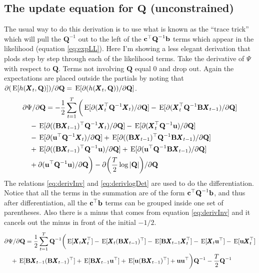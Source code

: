 \documentclass[]{article}
\def\UPS{\mbox{\boldmath $\Upsilon$}}
\def\BB{\mbox{$\mathbf B$}}	\def\bb{\mbox{$\mathbf b$}} \def\Bb{\mbox{$\mathbf J$}} \def\Ba{\mbox{$\mathbf L$}} \def\Bm{\UPS}
\def\E{\,\textup{\textrm{E}}}
\def\QQ{\mbox{$\mathbf Q$}}	 \def\qq{\mbox{$\mathbf q$}} \def\Qb{\mbox{$\mathbf G$}}  \def\Qm{\mathbb{Q}}
\def\XX{\mbox{$\pmb{X}$}}	\def\xx{\mbox{$\pmb{x}$}}
\begin{document}
\subsection{The update equation for $\QQ$ (unconstrained)}
\label{subsec:Qunconstrained}
The usual way to do this derivation is to use what is known as the ``trace trick'' which will pull the $\QQ^{-1}$ out to the left of the $\cc^\top\QQ^{-1}\bb$ terms which appear in the likelihood (equation \ref{eq:expLL}).  Here I'm showing a less elegant derivation that plods step by step through each of the likelihood terms.  Take the derivative of $\Psi$ with respect to $\QQ$. Terms not involving $\QQ$ equal 0 and drop out.   Again the expectations are placed outside the partials by noting that $\partial(\E[h(\XX_t,\QQ)])/\partial\QQ=\E[\partial(h(\XX_t,\QQ))/\partial\QQ]$. 
\begin{equation}\label{eq:Q.unconstrained1}
\begin{split}
&\partial\Psi/\partial\QQ = -\frac{1}{2} \sum_{t=1}^T\bigg(
\E[\partial(\XX_t^\top\QQ^{-1}\XX_t)/\partial\QQ]
-\E[\partial(\XX_t^\top\QQ^{-1}\BB\XX_{t-1})/\partial\QQ] \\
&\quad -\E[\partial((\BB\XX_{t-1})^\top\QQ^{-1}\XX_t)/\partial\QQ ]
 - \E[\partial(\XX_t^\top\QQ^{-1}\uu)/\partial\QQ] \\
&\quad - \E[\partial(\uu^\top\QQ^{-1}\XX_t)/\partial\QQ] 
+ \E[\partial((\BB\XX_{t-1})^\top\QQ^{-1}\BB\XX_{t-1})/\partial\QQ] \\
&\quad + \E[\partial((\BB\XX_{t-1})^\top\QQ^{-1}\uu)/\partial\QQ] 
+ \E[\partial(\uu^\top\QQ^{-1}\BB\XX_{t-1})/\partial\QQ]\\
&\quad +\partial(\uu^\top\QQ^{-1}\uu)/\partial\QQ
\bigg) - \partial\bigg(\frac{T}{2}\log |\QQ| \bigg)/\partial\QQ \\
\end{split}
\end{equation}
The relations \eqref{eq:derivInv} and \eqref{eq:derivlogDet} are used to do the differentiation. Notice that all the terms in the summation are of the form $\cc^\top\QQ^{-1}\bb$, and thus after differentiation, all the $\cc^\top\bb$ terms can be grouped inside one set of parentheses.  Also there is a minus that comes from equation \ref{eq:derivInv} and it cancels out the minus in front of the initial $-1/2$.
\begin{equation}\label{eq:Q.unconstrained2}
\begin{split}
&\partial\Psi/\partial\QQ = \frac{1}{2} \sum_{t=1}^T \QQ^{-1} \bigg( 
 \E[\XX_t\XX_t^\top] -\E[\XX_t(\BB\XX_{t-1})^\top ] - \E[\BB\XX_{t-1}\XX_t^\top ]  - \E[ \XX_t\uu^\top ] - \E[ \uu\XX_t^\top ] \\
&\quad + \E[ \BB\XX_{t-1}(\BB\XX_{t-1})^\top ] + \E[\BB\XX_{t-1}\uu^\top] + \E[ \uu(\BB\XX_{t-1})^\top ] + \uu\uu^\top \bigg)\QQ^{-1} - \frac{T}{2}\QQ^{-1} 
\end{split}
\end{equation}
\end{document}
